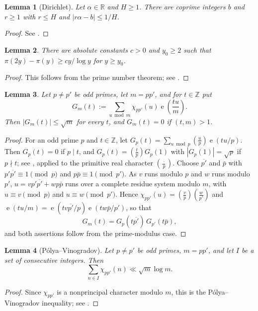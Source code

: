 \documentclass[11pt]{amsart}
\numberwithin{equation}{section}
\numberwithin{figure}{section}
\newtheorem{lemma}{Lemma}[section]
\theoremstyle{definition}
\newcommand{\Z}{\mathbb{Z}}
\newcommand{\R}{\mathbb{R}}
\newcommand{\e}{\operatorname{e}}
\begin{document}
\begin{lemma}[Dirichlet]\label{lem:Dirichlet}
Let $\alpha\in\R$ and $H\ge1$.  There are coprime integers $b$ and
$r\ge1$ with $r\le H$ and $|r\alpha-b|\le1/H$.
\end{lemma}

\begin{proof}
See \cite[Lemma~2.1]{Vaughan}.
\end{proof}

\begin{lemma}\label{lem:primes}
There are absolute constants $c>0$ and $y_0\ge2$ such that
$\pi(2y)-\pi(y)\ge cy/\log y$ for $y\ge y_0$.
\end{lemma}

\begin{proof}
This follows from the prime number theorem; see \cite[Theorem~6.9]{MV}.
\end{proof}

\begin{lemma}\label{lem:Gauss}
Let $p\ne p'$ be odd primes, let $m=pp'$, and for $t\in\Z$ put
\[
  G_m(t):=\sum_{u\bmod m}\chi_{pp'}(u)\e\left(\frac{tu}m\right).
\]
Then $|G_m(t)|\le\sqrt m$ for every $t$, and $G_m(t)=0$ if $(t,m)>1$.
\end{lemma}

\begin{proof}
For an odd prime $p$ and $t\in\Z$, let
$G_p(t)=\sum_{u\bmod p}(\tfrac up)\e(tu/p)$.  Then $G_p(t)=0$ if
$p\mid t$, and $G_p(t)=(\tfrac tp)G_p(1)$ with $|G_p(1)|=\sqrt p$ if
$p\nmid t$; see \cite[Theorem~9.7]{MV}, applied to the primitive real character $(\tfrac\cdot p)$.
Choose $\overline{p'}$ and $\bar p$ with $p'\overline{p'}\equiv1\pmod p$
and $p\bar p\equiv1\pmod{p'}$.  As $v$ runs modulo $p$ and $w$ runs modulo
$p'$, $u=vp'\overline{p'}+wp\bar p$ runs over a complete residue system
modulo $m$, with $u\equiv v\pmod p$ and $u\equiv w\pmod{p'}$.  Hence
$\chi_{pp'}(u)=(\tfrac vp)(\tfrac w{p'})$ and
$\e(tu/m)=\e(tv\overline{p'}/p)\e(tw\bar p/p')$, so that
\[
  G_m(t)=G_p(t\overline{p'})\,G_{p'}(t\bar p),
\]
and both assertions follow from the prime-modulus case.
\end{proof}

\begin{lemma}[P\'olya--Vinogradov]\label{lem:PV}
Let $p\ne p'$ be odd primes, $m=pp'$, and let $I$ be a set of consecutive
integers.  Then
\[
  \sum_{n\in I}\chi_{pp'}(n)\ll\sqrt m\log m.
\]
\end{lemma}

\begin{proof}
Since $\chi_{pp'}$ is a nonprincipal character modulo $m$, this is the
P\'olya--Vinogradov inequality; see \cite[Theorem~9.18]{MV}.
\end{proof}
\end{document}

